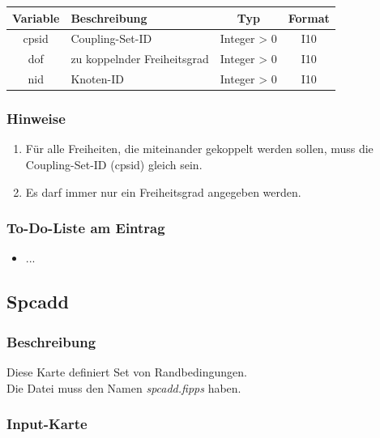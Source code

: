 \documentclass[11pt,titlepage,listof=totoc,bibliography=totoc,twoside]{scrreprt}
\begin{document}
{{\begin{tabularx}{\textwidth}{cXcc}
\toprule
Variable& Beschreibung		& Typ		& Format\\
\midrule
cpsid	& Coupling-Set-ID	& Integer > 0	& I10	\\
dof	& zu koppelnder Freiheitsgrad		& Integer > 0	& I10	\\
nid	& Knoten-ID		& Integer > 0	& I10	\\
\bottomrule
\end{tabularx}

\subsubsection{Hinweise}

\begin{enumerate}
\item Für alle Freiheiten, die miteinander gekoppelt werden sollen, muss die Coupling-Set-ID (cpsid) gleich sein.
\item Es darf immer nur ein Freiheitsgrad angegeben werden.
\end{enumerate}

\subsubsection{To-Do-Liste am Eintrag}

\begin{itemize}
\item ...
\end{itemize}

\newpage

\subsection{Spcadd}

\subsubsection{Beschreibung}

Diese Karte definiert Set von Randbedingungen.\\
Die Datei muss den Namen \emph{spcadd.fipps} haben.

\subsubsection{Input-Karte}

}}
\end{document}
